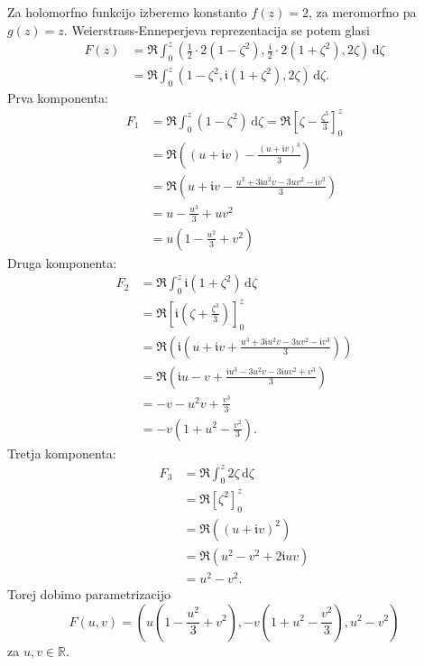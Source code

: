 \documentclass[fin1, tisk, bibtex]{fmfdelo}
\begin{document}
Za holomorfno funkcijo izberemo konstanto $f(z)=2$, za meromorfno pa $g(z)=z$. Weierstrass-Enneperjeva reprezentacija se potem glasi
\begin{align*}
    F(z)&=\Re \int_0^z\left(\frac{1}{2} \cdot 2\left(1-\zeta^2\right), \frac{\mathfrak{i}}{2} \cdot 2\left(1+\zeta^2\right), 2 \zeta\right) \, \mathrm{d} \zeta \\
    & = \Re \int_0^z\left(1-\zeta^2, \mathfrak{i}\left(1+\zeta^2\right), 2 \zeta\right) \, \mathrm{d} \zeta .
\end{align*}
Prva komponenta:
\begin{align*}
    F_1 & =\Re \int_0^z\left(1-\zeta^2\right) \, \mathrm{d} \zeta=\Re\left[\zeta-\frac{\zeta^3}{3}\right]_0^z \\
    & =\Re\left((u+\mathfrak{i} v)-\frac{(u+\mathfrak{i} v)^3}{3}\right) \\
    & =\Re\left(u+\mathfrak{i} v-\frac{u^3+3 \mathfrak{i} u^2 v-3 u v^2-\mathfrak{i} v^3}{3}\right) \\
    & =u-\frac{u^3}{3}+u v^2\\
    &=u\left(1-\frac{u^2}{3}+v^2\right)
\end{align*}
Druga komponenta:
\begin{align*}
    F_2 & =\Re \int_0^z \mathfrak{i}\left(1+\zeta^2\right) \, \mathrm{d} \zeta\\
    &=\Re\left[\mathfrak{i}\left(\zeta+\frac{\zeta^3}{3}\right)\right]_0^z \\
    & =\Re\left(\mathfrak{i}\left(u+\mathfrak{i} v+\frac{u^3+3 \mathfrak{i} u^2 v-3 u v^2-\mathfrak{i} v^3}{3}\right)\right) \\
    & =\Re\left(\mathfrak{i} u-v+\frac{\mathfrak{i} u^3-3 u^2 v-3 \mathfrak{i} u v^2+v^3}{3}\right) \\
    & =-v-u^2 v+\frac{v^3}{3}\\
    &=-v\left(1+u^2-\frac{v^2}{3}\right) .
\end{align*}
Tretja komponenta:
\begin{align*}
    F_3 & =\Re \int_0^z 2 \zeta \, \mathrm{d} \zeta\\
    &=\Re\left[\zeta^2\right]_0^z \\
    & =\Re\left((u+\mathfrak{i} v)^2\right)\\
    &=\Re\left(u^2-v^2+2 \mathfrak{i} u v\right)\\
    &=u^2-v^2 .
\end{align*}
Torej dobimo parametrizacijo
\begin{equation*}
    F(u, v) = \left( u\left(1 - \frac{u^2}{3} + v^2\right), -v\left(1+u^2-\frac{v^2}{3}\right), u^2 - v^2 \right)
\end{equation*}
za $u,v \in \mathbb{R}$.
\end{document}
